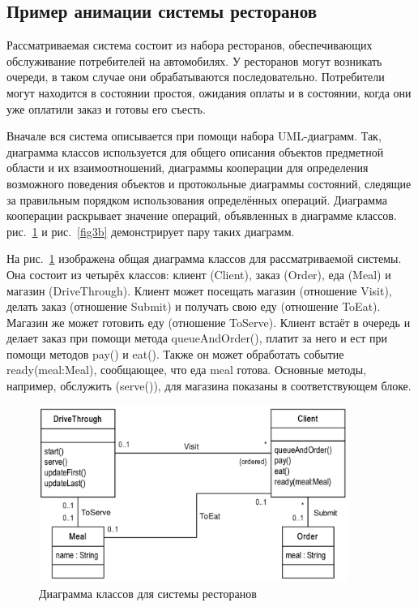 \documentclass[a5paper]{article}
\begin{document}
\subsection{Пример анимации системы ресторанов}

Рассматриваемая система состоит из набора ресторанов, обеспечивающих обслуживание потребителей на автомобилях. У ресторанов могут возникать очереди, в таком случае они обрабатываются последовательно. Потребители могут находится в состоянии простоя, ожидания оплаты и в состоянии, когда они уже оплатили заказ и готовы его съесть.

Вначале вся система описывается при помощи набора UML-диаграмм. Так, диаграмма классов используется для общего описания объектов предметной области и их взаимоотношений, диаграммы кооперации для определения возможного поведения объектов и протокольные диаграммы состояний, следящие за правильным порядком использования определённых операций. Диаграмма кооперации раскрывает значение операций, объявленных в диаграмме классов. рис.~\ref{fig3a} и рис.~\ref{fig3b} демонстрирует пару таких диаграмм.

На рис.~\ref{fig3a} изображена общая диаграмма классов для рассматриваемой системы. Она состоит из четырёх классов: клиент (Client), заказ (Order), еда (Meal) и магазин (DriveThrough). Клиент может посещать магазин (отношение Visit), делать заказ (отношение Submit) и получать свою еду (отношение ToEat). Магазин же может готовить еду (отношение ToServe). Клиент встаёт в очередь и делает заказ при помощи метода queueAndOrder(), платит за него и ест при помощи методов pay() и eat(). Также он может обработать событие ready(meal:Meal), сообщающее, что еда meal готова. Основные методы, например, обслужить (serve()), для магазина показаны в соответствующем блоке.

\begin{figure} [ht]
  \begin{center}
    \includegraphics[width=0.9\textwidth]{3a.png}
    \caption{Диаграмма классов для системы ресторанов}
    \label{fig3a}
  \end{center}
\end{figure}
\end{document}
